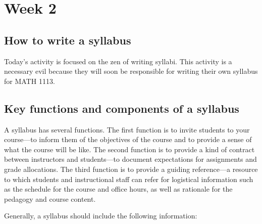 \section{Week 2}
\label{sec:week-2}

\subsection{How to write a syllabus}
\label{sec:how-write-syllabus}

Today's activity is focused on the zen of writing syllabi.  This activity is a necessary evil because they will soon be responsible for writing their own syllabus for MATH 1113.  

\subsection{Key functions and components of a syllabus}
\label{sec:key-funct-comp}

A syllabus has several functions. The first function is to invite students to your course—to inform them of the objectives of the course and to provide a sense of what the course will be like. The second function is to provide a kind of contract between instructors and students—to document expectations for assignments and grade allocations. The third function is to provide a guiding reference—a resource to which students and instructional staff can refer for logistical information such as the schedule for the course and office hours, as well as rationale for the pedagogy and course content.

Generally, a syllabus should include the following information:

